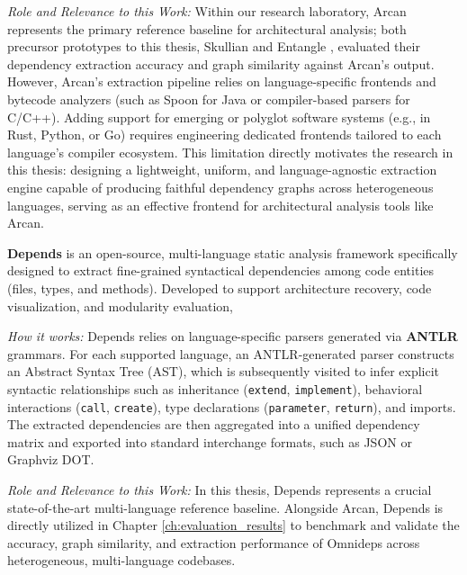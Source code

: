 \textit{Role and Relevance to this Work:} Within our research laboratory,
Arcan represents the primary reference baseline for architectural analysis;
both precursor prototypes to this thesis, Skullian \cite{refolli_2023} and
Entangle \cite{teruzzi_2024}, evaluated their dependency extraction accuracy
and graph similarity against Arcan's output. However, Arcan's extraction
pipeline relies on language-specific frontends and bytecode analyzers (such as
Spoon for Java or compiler-based parsers for C/C++). Adding support for emerging
or polyglot software systems (e.g., in Rust, Python, or Go) requires
engineering dedicated frontends tailored to each language's compiler ecosystem.
This limitation directly motivates the research in this thesis: designing a
lightweight, uniform, and language-agnostic extraction engine capable of
producing faithful dependency graphs across heterogeneous languages, serving as
an effective frontend for architectural analysis tools like Arcan.

\textbf{Depends} \cite{depends_github} is an open-source, multi-language static
analysis framework specifically designed to extract fine-grained syntactical
dependencies among code entities (files, types, and methods). Developed to
support architecture recovery, code visualization, and modularity evaluation,

\textit{How it works:} Depends relies on language-specific parsers generated
via \textbf{ANTLR} grammars. For each supported language, an ANTLR-generated
parser constructs an Abstract Syntax Tree (AST), which is subsequently visited
to infer explicit syntactic relationships such as inheritance (\texttt{extend},
\texttt{implement}), behavioral interactions (\texttt{call}, \texttt{create}),
type declarations (\texttt{parameter}, \texttt{return}), and imports. The
extracted dependencies are then aggregated into a unified dependency matrix and
exported into standard interchange formats, such as JSON or Graphviz DOT.

\textit{Role and Relevance to this Work:} In this thesis, Depends represents a
crucial state-of-the-art multi-language reference baseline. Alongside Arcan,
Depends is directly utilized in Chapter \ref{ch:evaluation_results} to benchmark
and validate the accuracy, graph similarity, and extraction performance of
Omnideps across heterogeneous, multi-language codebases.

